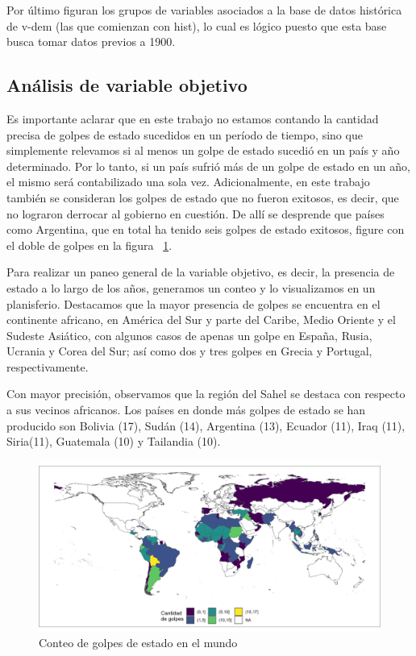 \documentclass{article}
\begin{document}
Por último figuran los grupos de variables asociados a la base de datos histórica
de v-dem (las que comienzan con hist), lo cual es lógico puesto que esta base busca
tomar datos previos a 1900.

\subsection{Análisis de variable objetivo}

Es importante aclarar que en este trabajo no estamos contando la cantidad precisa
de golpes de estado sucedidos en un período de tiempo, sino que simplemente relevamos
si al menos un golpe de estado sucedió en un país y año determinado. Por lo tanto, si
un país sufrió más de un golpe de estado en un año, el mismo será contabilizado una
sola vez. Adicionalmente, en este trabajo también se consideran los golpes de estado
que no fueron exitosos, es decir, que no lograron derrocar al gobierno en cuestión. 
De allí se desprende que países como Argentina, que en total ha tenido seis golpes de 
estado exitosos, figure con el doble de golpes en la figura ~\ref{fig::mapa_golpes}.

Para realizar un paneo general de la variable objetivo, es decir, la presencia de
estado a lo largo de los años, generamos un conteo y lo visualizamos en un 
planisferio. Destacamos que la mayor presencia de golpes se encuentra en el 
continente africano, en América del Sur y parte del Caribe, Medio Oriente y el 
Sudeste Asiático, con algunos casos de apenas un golpe en España, Rusia, Ucrania 
y Corea del Sur; así como dos y tres golpes en Grecia y Portugal, respectivamente.

Con mayor precisión, observamos que la región del Sahel se destaca con respecto a sus
vecinos africanos. Los países en donde más golpes de estado se han producido son
Bolivia (17), Sudán (14), Argentina (13), Ecuador (11), Iraq (11), Siria(11), 
Guatemala (10) y Tailandia (10).

\begin{figure}[H]
  \centering  
  \includegraphics[width=1\textwidth]{2_golpes.png}
  \caption{Conteo de golpes de estado en el mundo\label{fig::mapa_golpes}}
\end{figure}
\end{document}
